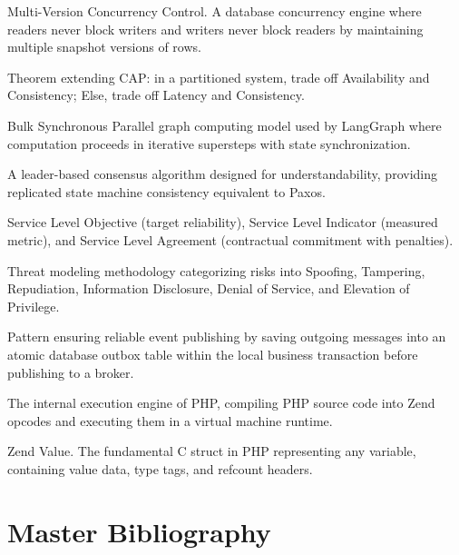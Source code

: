 \documentclass[11pt,oneside]{book}
\begin{document}
\begin{description}[leftmargin=2.5cm,style=nextline]
  \item[MVCC] Multi-Version Concurrency Control. A database concurrency engine where readers never block writers and writers never block readers by maintaining multiple snapshot versions of rows.
  \item[PACELC] Theorem extending CAP: in a partitioned system, trade off Availability and Consistency; Else, trade off Latency and Consistency.
  \item[Pregel] Bulk Synchronous Parallel graph computing model used by LangGraph where computation proceeds in iterative supersteps with state synchronization.
  \item[Raft] A leader-based consensus algorithm designed for understandability, providing replicated state machine consistency equivalent to Paxos.
  \item[SLO / SLI / SLA] Service Level Objective (target reliability), Service Level Indicator (measured metric), and Service Level Agreement (contractual commitment with penalties).
  \item[STRIDE] Threat modeling methodology categorizing risks into Spoofing, Tampering, Repudiation, Information Disclosure, Denial of Service, and Elevation of Privilege.
  \item[Transactional Outbox] Pattern ensuring reliable event publishing by saving outgoing messages into an atomic database outbox table within the local business transaction before publishing to a broker.
  \item[Zend Engine] The internal execution engine of PHP, compiling PHP source code into Zend opcodes and executing them in a virtual machine runtime.
  \item[zval] Zend Value. The fundamental C struct in PHP representing any variable, containing value data, type tags, and refcount headers.
\end{description}

\chapter*{Master Bibliography}


\end{document}
